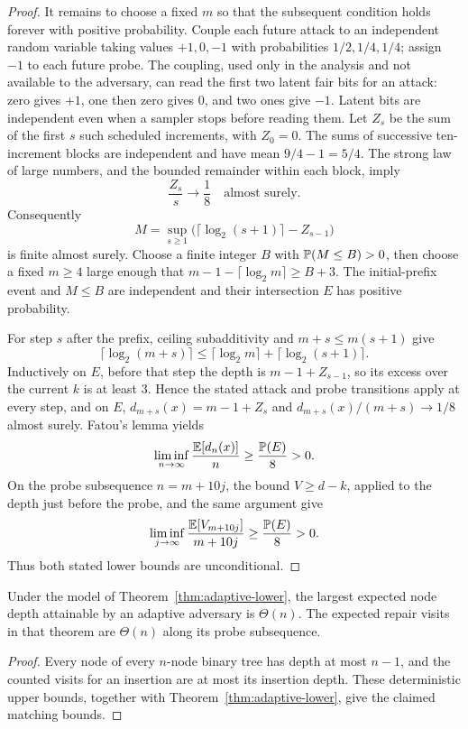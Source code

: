 \begin{proof}
It remains to choose a fixed $m$ so that the subsequent condition holds forever
with positive probability. Couple each future attack to an independent random
variable taking values $+1,0,-1$ with probabilities $1/2,1/4,1/4$; assign
$-1$ to each future probe. The coupling, used only in the analysis and not
available to the adversary, can read the first two latent fair bits
for an attack: zero gives $+1$, one then zero gives $0$, and two ones give
$-1$. Latent bits are independent even when a sampler stops before reading
them. Let $Z_s$ be the sum of the first $s$ such scheduled increments, with
$Z_0=0$. The sums of successive ten-increment blocks are independent and have
mean $9/4-1=5/4$. The strong law of large numbers, and the bounded remainder
within each block, imply
\[ \frac{Z_s}{s}\longrightarrow\frac18 \quad\text{almost surely}. \]
Consequently
\[ M=\sup_{s\geq1}\bigl(\lceil\log_2(s+1)\rceil-Z_{s-1}\bigr) \]
is finite almost surely. Choose a finite integer $B$ with $\mathbb{P}(M\leq B)>0$,
then choose a fixed $m\geq4$ large enough that
$m-1-\lceil\log_2m\rceil\geq B+3$. The initial-prefix event and $M\leq B$
are independent and their intersection $E$ has positive probability.

For step $s$ after the prefix, ceiling subadditivity and $m+s\leq m(s+1)$ give
\[\lceil\log_2(m+s)\rceil\leq
  \lceil\log_2m\rceil+\lceil\log_2(s+1)\rceil.\]
Inductively on $E$, before that step the depth is $m-1+Z_{s-1}$, so its
excess over the current $k$ is at least $3$. Hence the stated attack and probe
transitions apply at every step, and on $E$,
$d_{m+s}(x)=m-1+Z_s$ and $d_{m+s}(x)/(m+s)\to1/8$ almost surely.
Fatou's lemma yields
\[ \liminf_{n\to\infty}\frac{\mathbb E[d_n(x)]}{n}
   \geq \frac{\mathbb{P}(E)}8>0.\]
On the probe subsequence $n=m+10j$, the bound $V\geq d-k$, applied to the
depth just before the probe, and the same argument give
\[ \liminf_{j\to\infty}\frac{\mathbb E[V_{m+10j}]}{m+10j}
   \geq \frac{\mathbb{P}(E)}8>0.\]
Thus both stated lower bounds are unconditional.
\end{proof}

\begin{corollary}\label{cor:adaptive-tight}
Under the model of Theorem~\ref{thm:adaptive-lower}, the largest expected
node depth attainable by an adaptive adversary is $\Theta(n)$. The expected
repair visits in that theorem are $\Theta(n)$ along its probe subsequence.
\end{corollary}
\begin{proof}
Every node of every $n$-node binary tree has depth at most $n-1$, and the
counted visits for an insertion are at most its insertion depth. These
deterministic upper bounds, together with Theorem~\ref{thm:adaptive-lower},
give the claimed matching bounds.
\end{proof}

